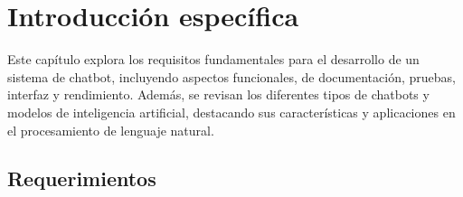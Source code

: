 
\chapter{Introducción específica}  
 
 
Este capítulo explora los requisitos fundamentales para el desarrollo de un sistema de chatbot, incluyendo aspectos funcionales, de documentación, pruebas, interfaz y rendimiento. Además, se revisan los diferentes tipos de chatbots y modelos de inteligencia artificial, destacando sus características y aplicaciones en el procesamiento de lenguaje natural.


\section{Requerimientos}

